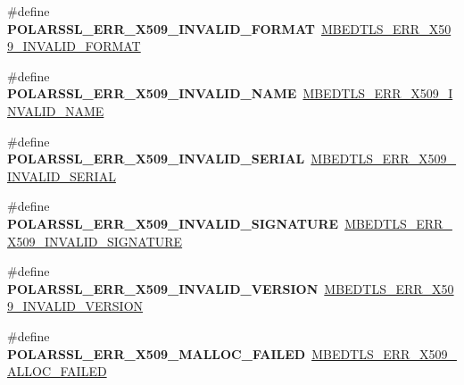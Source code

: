 \begin{DoxyCompactItemize}
\item 
\mbox{\label{compat-1_83_8h_abbb0baf5d3e9281b059e3177138f4eaf}} 
\#define {\bfseries P\+O\+L\+A\+R\+S\+S\+L\+\_\+\+E\+R\+R\+\_\+\+X509\+\_\+\+I\+N\+V\+A\+L\+I\+D\+\_\+\+F\+O\+R\+M\+AT}~\mbox{\hyperlink{group__x509__module_ga45b8366804b7e2cbf3e25011f054802c}{M\+B\+E\+D\+T\+L\+S\+\_\+\+E\+R\+R\+\_\+\+X509\+\_\+\+I\+N\+V\+A\+L\+I\+D\+\_\+\+F\+O\+R\+M\+AT}}
\item 
\mbox{\label{compat-1_83_8h_a3cf47af101f614432b19192a7a239fe3}} 
\#define {\bfseries P\+O\+L\+A\+R\+S\+S\+L\+\_\+\+E\+R\+R\+\_\+\+X509\+\_\+\+I\+N\+V\+A\+L\+I\+D\+\_\+\+N\+A\+ME}~\mbox{\hyperlink{group__x509__module_ga8f61c2f303bf065af4f783e03f952ede}{M\+B\+E\+D\+T\+L\+S\+\_\+\+E\+R\+R\+\_\+\+X509\+\_\+\+I\+N\+V\+A\+L\+I\+D\+\_\+\+N\+A\+ME}}
\item 
\mbox{\label{compat-1_83_8h_a5dfc778ab9a1d46f8c31296050fb0e84}} 
\#define {\bfseries P\+O\+L\+A\+R\+S\+S\+L\+\_\+\+E\+R\+R\+\_\+\+X509\+\_\+\+I\+N\+V\+A\+L\+I\+D\+\_\+\+S\+E\+R\+I\+AL}~\mbox{\hyperlink{group__x509__module_ga8124a68edabf35ed9323880584128f16}{M\+B\+E\+D\+T\+L\+S\+\_\+\+E\+R\+R\+\_\+\+X509\+\_\+\+I\+N\+V\+A\+L\+I\+D\+\_\+\+S\+E\+R\+I\+AL}}
\item 
\mbox{\label{compat-1_83_8h_a56da6070740e4f0e102fd473dbe54b8c}} 
\#define {\bfseries P\+O\+L\+A\+R\+S\+S\+L\+\_\+\+E\+R\+R\+\_\+\+X509\+\_\+\+I\+N\+V\+A\+L\+I\+D\+\_\+\+S\+I\+G\+N\+A\+T\+U\+RE}~\mbox{\hyperlink{group__x509__module_ga022c175386f082b4e056e6268ee68cab}{M\+B\+E\+D\+T\+L\+S\+\_\+\+E\+R\+R\+\_\+\+X509\+\_\+\+I\+N\+V\+A\+L\+I\+D\+\_\+\+S\+I\+G\+N\+A\+T\+U\+RE}}
\item 
\mbox{\label{compat-1_83_8h_a7fb5d1b9bb950f41cf57a6e156a318ff}} 
\#define {\bfseries P\+O\+L\+A\+R\+S\+S\+L\+\_\+\+E\+R\+R\+\_\+\+X509\+\_\+\+I\+N\+V\+A\+L\+I\+D\+\_\+\+V\+E\+R\+S\+I\+ON}~\mbox{\hyperlink{group__x509__module_ga527608dc04b2c831fe5b161ec26aab76}{M\+B\+E\+D\+T\+L\+S\+\_\+\+E\+R\+R\+\_\+\+X509\+\_\+\+I\+N\+V\+A\+L\+I\+D\+\_\+\+V\+E\+R\+S\+I\+ON}}
\item 
\mbox{\label{compat-1_83_8h_a60a90a6a7f6ee7a23c186d6870d8e4c8}} 
\#define {\bfseries P\+O\+L\+A\+R\+S\+S\+L\+\_\+\+E\+R\+R\+\_\+\+X509\+\_\+\+M\+A\+L\+L\+O\+C\+\_\+\+F\+A\+I\+L\+ED}~\mbox{\hyperlink{group__x509__module_gacf6d98c6cbb76728260d1dcb1fe3bc7d}{M\+B\+E\+D\+T\+L\+S\+\_\+\+E\+R\+R\+\_\+\+X509\+\_\+\+A\+L\+L\+O\+C\+\_\+\+F\+A\+I\+L\+ED}}

\end{DoxyCompactItemize}
